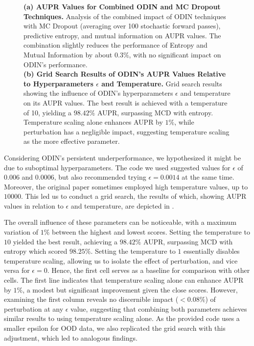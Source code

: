 \begin{figure}[H]
\begin{subfigure}{0.45\textwidth}
        \caption{}
        \label{fig:odin_grid_search}
    \end{subfigure}%
    \caption{\textbf{(a) AUPR Values for Combined ODIN and MC Dropout Techniques.} Analysis of the combined impact of ODIN techniques with MC Dropout (averaging over 100 stochastic forward passes), predictive entropy, and mutual information on AUPR values. The combination slightly reduces the performance of Entropy and Mutual Information by about $0.3\%$, with no significant impact on ODIN's performance.\\\textbf{(b) Grid Search Results of ODIN's AUPR Values Relative to Hyperparameters $\epsilon$ and Temperature.} Grid search results showing the influence of ODIN's hyperparameters $\epsilon$ and temperature on its AUPR values. The best result is achieved with a temperature of 10, yielding a $98.42\%$ AUPR, surpassing MCD with entropy. Temperature scaling alone enhances AUPR by $1\%$, while perturbation has a negligible impact, suggesting temperature scaling as the more effective parameter.}
\end{figure}

Considering ODIN's persistent underperformance, we hypothesized it might be due to suboptimal hyperparameters. The code we used suggested values for $ \epsilon $ of $0.006$ and $0.0006$, but also recommended trying $ \epsilon = 0.0014 $ at the same time. Moreover, the original paper sometimes employed high temperature values, up to $10000$. This led us to conduct a grid search, the results of which, showing AUPR values in relation to $ \epsilon $ and temperature, are depicted in .

The overall influence of these parameters can be noticeable, with a maximum variation of $1\%$ between the highest and lowest scores. Setting the temperature to $ 10 $ yielded the best result, achieving a $98.42\%$ AUPR, surpassing MCD with entropy which scored $98.25\%$. Setting the temperature to $ 1 $ essentially disables temperature scaling, allowing us to isolate the effect of perturbation, and vice versa for $ \epsilon = 0 $. Hence, the first cell serves as a baseline for comparison with other cells. The first line indicates that temperature scaling alone can enhance AUPR by $1\%$, a modest but significant improvement given the close scores. However, examining the first column reveals no discernible impact ($<0.08\%$) of perturbation at any $ \epsilon $ value, suggesting that combining both parameters achieves similar results to using temperature scaling alone. As the provided code uses a smaller epsilon for OOD data, we also replicated the grid search with this adjustment, which led to analogous findings.